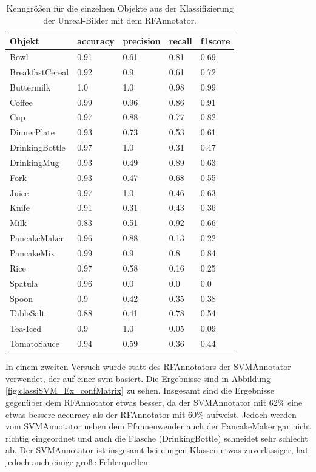 \begin{table}
\begin{tabularx}{\textwidth}{Xllll}
\textbf{Objekt}	& \textbf{\gls{accuracy}} & \textbf{\gls{precision}}	& \textbf{\gls{recall}}	& \textbf{\gls{f1score}} \\ \hline
Bowl & 0.91 & 0.61 & 0.81 & 0.69 \\  
BreakfastCereal & 0.92 & 0.9 & 0.61 & 0.72 \\  
Buttermilk & 1.0 & 1.0 & 0.98 & 0.99 \\  
Coffee & 0.99 & 0.96 & 0.86 & 0.91 \\  
Cup & 0.97 & 0.88 & 0.77 & 0.82 \\  
DinnerPlate & 0.93 & 0.73 & 0.53 & 0.61 \\  
DrinkingBottle & 0.97 & 1.0 & 0.31 & 0.47 \\  
DrinkingMug & 0.93 & 0.49 & 0.89 & 0.63 \\  
Fork & 0.93 & 0.47 & 0.68 & 0.55 \\  
Juice & 0.97 & 1.0 & 0.46 & 0.63 \\  
Knife & 0.91 & 0.31 & 0.43 & 0.36 \\  
Milk & 0.83 & 0.51 & 0.92 & 0.66 \\  
PancakeMaker & 0.96 & 0.88 & 0.13 & 0.22 \\  
PancakeMix & 0.99 & 0.9 & 0.8 & 0.84 \\  
Rice & 0.97 & 0.58 & 0.16 & 0.25 \\  
Spatula & 0.96 & 0.0 & 0.0 & 0.0 \\  
Spoon & 0.9 & 0.42 & 0.35 & 0.38 \\  
TableSalt & 0.88 & 0.41 & 0.78 & 0.54 \\  
Tea-Iced & 0.9 & 1.0 & 0.05 & 0.09 \\  
TomatoSauce & 0.94 & 0.59 & 0.36 & 0.44 \\  
\end{tabularx}
\caption[Objekt-spezifische Kenngrößen des RFAnnotators]{Kenngrößen für die einzelnen Objekte aus der Klassifizierung der Unreal-Bilder mit dem RFAnnotator.}
\label{tab:classiRF_Ex_classMetrics}
\end{table}

In einem zweiten Versuch wurde statt des RFAnnotators der SVMAnnotator verwendet, der auf einer \gls{svm} basiert. Die Ergebnisse sind in Abbildung  \ref{fig:classiSVM_Ex_confMatrix} zu sehen. Insgesamt sind die Ergebnisse gegenüber dem RFAnnotator etwas besser, da der SVMAnnotator mit 62\% eine etwas bessere \gls{accuracy} als der RFAnnotator mit 60\% aufweist. Jedoch werden vom SVMAnnotator neben dem Pfannenwender auch der PancakeMaker gar nicht richtig eingeordnet und auch die Flasche (DrinkingBottle) schneidet sehr schlecht ab. Der SVMAnnotator ist insgesamt bei einigen Klassen etwas zuverlässiger, hat jedoch auch einige große Fehlerquellen. 

